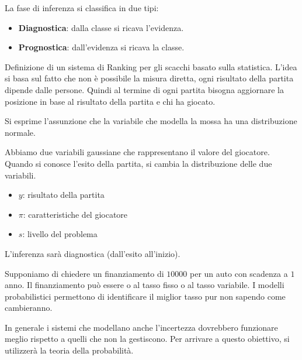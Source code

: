La fase di inferenza si classifica in due tipi:
\begin{itemize}
    \item \textbf{Diagnostica}: dalla classe si ricava l'evidenza.
    \item \textbf{Prognostica}: dall'evidenza si ricava la classe.
\end{itemize}
\begin{esempio}
    Definizione di un sistema di Ranking per gli scacchi basato sulla statistica.
    L'idea si basa sul fatto che non è possibile la misura diretta, ogni
    risultato della partita dipende dalle persone. Quindi al termine di ogni
    partita bisogna aggiornare la posizione in base al risultato della partita e
    chi ha giocato.

    Si esprime l'assunzione che la variabile che modella la mossa ha una
    distribuzione normale.

    Abbiamo due variabili gaussiane che rappresentano il valore del giocatore.
    Quando si conosce l'esito della partita, si cambia la distribuzione delle
    due variabili.
    \begin{itemize}
        \item $y$: risultato della partita
        \item $\pi$: caratteristiche del giocatore
        \item $s$: livello del problema
    \end{itemize}
    L'inferenza sarà diagnostica (dall'esito all'inizio).
\end{esempio}
\begin{esempio}
    Supponiamo di chiedere un finanziamento di $10000$ per un auto con scadenza
    a $1$ anno. Il finanziamento può essere o al tasso fisso o al tasso variabile.
    I modelli probabilistici permettono di identificare il miglior tasso pur non
    sapendo come cambieranno.
\end{esempio}
In generale i sistemi che modellano anche l'incertezza dovrebbero funzionare 
meglio rispetto a quelli che non la gestiscono. Per arrivare a questo obiettivo, 
si utilizzerà la teoria della probabilità.
